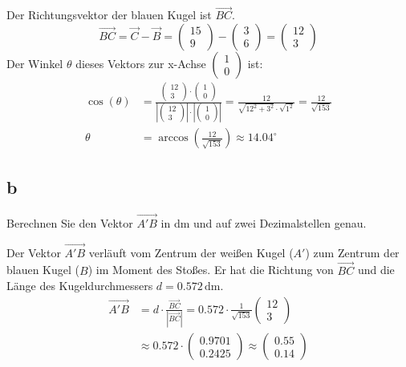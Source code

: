 Der Richtungsvektor der blauen Kugel ist \(\vec{BC}\).
\[
\vec{BC} = \vec{C} - \vec{B} = \begin{pmatrix} 15 \\ 9 \end{pmatrix} - \begin{pmatrix} 3 \\ 6 \end{pmatrix} = \begin{pmatrix} 12 \\ 3 \end{pmatrix}
\]
Der Winkel \(\theta\) dieses Vektors zur x-Achse \(\begin{pmatrix} 1 \\ 0 \end{pmatrix}\) ist:
\begin{align*}
    \cos(\theta) &= \frac{\begin{pmatrix} 12 \\ 3 \end{pmatrix} \cdot \begin{pmatrix} 1 \\ 0 \end{pmatrix}}{|\begin{pmatrix} 12 \\ 3 \end{pmatrix}| \cdot |\begin{pmatrix} 1 \\ 0 \end{pmatrix}|} = \frac{12}{\sqrt{12^2 + 3^2} \cdot \sqrt{1^2}} = \frac{12}{\sqrt{153}} \\
    \theta &= \arccos\left(\frac{12}{\sqrt{153}}\right) \approx 14.04^\circ
\end{align*}

\subsection{b}
Berechnen Sie den Vektor \(\vec{A'B}\) in dm und auf zwei Dezimalstellen genau.

Der Vektor \(\vec{A'B}\) verläuft vom Zentrum der weißen Kugel (\(A'\)) zum Zentrum der blauen Kugel (\(B\)) im Moment des Stoßes. Er hat die Richtung von \(\vec{BC}\) und die Länge des Kugeldurchmessers \(d = 0.572\,\text{dm}\).
\begin{align*}
    \vec{A'B} &= d \cdot \frac{\vec{BC}}{|\vec{BC}|} = 0.572 \cdot \frac{1}{\sqrt{153}}\begin{pmatrix} 12 \\ 3 \end{pmatrix} \\
    &\approx 0.572 \cdot \begin{pmatrix} 0.9701 \\ 0.2425 \end{pmatrix} \approx \begin{pmatrix} 0.55 \\ 0.14 \end{pmatrix}
\end{align*}

